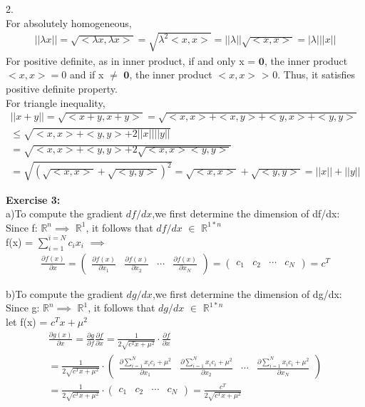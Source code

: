 \documentclass{article}
\begin{document}
2.\\
For absolutely homogeneous, 
\begin{gather}
	||\lambda x || = \sqrt{ <\lambda x,\lambda x>} = \sqrt{\lambda ^2 <x,x>} = ||\lambda|| \sqrt{<x,x>} = |\lambda| ||x||
\end{gather}
For positive definite, as in inner product, if and only x = $\textbf{0}$, the inner product $<x,x> = 0$ and if x $\neq$  $\textbf{0}$, the inner product $<x,x>$ > 0. Thus, it satisfies positive definite property.\\
For triangle inequality,
\begin{gather}
||x+y|| = \sqrt{<x+y,x+y>} = \sqrt{<x,x> + <x,y> + <y,x> + <y,y>}  \\
\leq  \sqrt{<x,x> + <y,y> + 2||x||||y||} \\
= \sqrt{<x,x> + <y,y> + 2\sqrt{<x,x><y,y>}}\\
= \sqrt{(\sqrt{<x,x>} + \sqrt{<y,y>})^2}
= \sqrt{<x,x>} + \sqrt{<y,y>} = ||x|| + ||y||
\end{gather}

\textbf{Exercise 3:}\\
a)To compute the gradient $df/dx$,we first determine the dimension of df/dx: Since f: $\mathbb{R}^n \implies$  $\mathbb{R}^1$, it follows that $df/dx$ $\in$ $\mathbb{R}^{1*n}$\\
f(x) = $\sum_{i=1}^{i=N} c_i x_i$ $\implies$ \\
\begin{gather}
\frac{\partial f(x)}{\partial x} = 
\begin{pmatrix}
	\frac{\partial f(x)}{\partial x_1} & \frac{\partial f(x)}{\partial x_2} & \cdots & \frac{\partial f(x)}{\partial x_N} 
\end{pmatrix} = \begin{pmatrix}
c_1 & c_2 & \cdots & c_N
\end{pmatrix}  = c^T
\end{gather}

b)To compute the gradient $dg/dx$,we first determine the dimension of dg/dx: Since g: $\mathbb{R}^n \implies$  $\mathbb{R}^1$, it follows that $dg/dx$ $\in$ $\mathbb{R}^{1*n}$\\
let f(x) = $c^Tx + \mu^2$
\begin{gather}
\frac{\partial g(x)}{\partial x} = \frac{\partial g}{\partial f}  \frac{\partial f}{\partial x} =  \frac{1}{2\sqrt{c^Tx + \mu^2}} \cdot \frac{\partial f}{\partial x} \\ =  \frac{1}{2\sqrt{c^Tx + \mu^2}} \cdot \begin{pmatrix}
\frac{\partial \sum_{i=1}^N x_{i}c_i + \mu^2}{\partial x_{1}} & \frac{\partial \sum_{i=1}^N x_{i}c_i + \mu^2}{\partial x_{2}} & \cdots & \frac{\partial \sum_{i=1}^N x_{i}c_i + \mu^2}{\partial x_{N}} 
\end{pmatrix} \\ = \frac{1}{2\sqrt{c^Tx + \mu^2}} \cdot \begin{pmatrix}
c_1 & c_2 & \cdots & c_N
\end{pmatrix}  =\frac{c^T}{2\sqrt{c^Tx+\mu^2}}
\end{gather}
\end{document}
